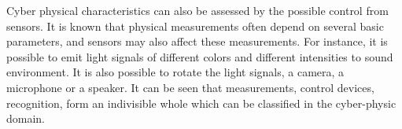 \documentclass[10pt,a4paper]{article}
\begin{document}
Cyber physical characteristics can also be assessed by the possible control from sensors.
It is known that physical measurements often depend on several basic parameters, and sensors may also affect these measurements. For instance, it is possible to emit light signals of different colors and different intensities to sound environment. It is also possible to rotate the light signals, a camera, a microphone or a speaker. It can be seen that measurements, control devices, recognition, form an indivisible whole which can be classified in the cyber-physic domain.







%
%
%
%
%

\nocite{*}
\small




\end{document}
